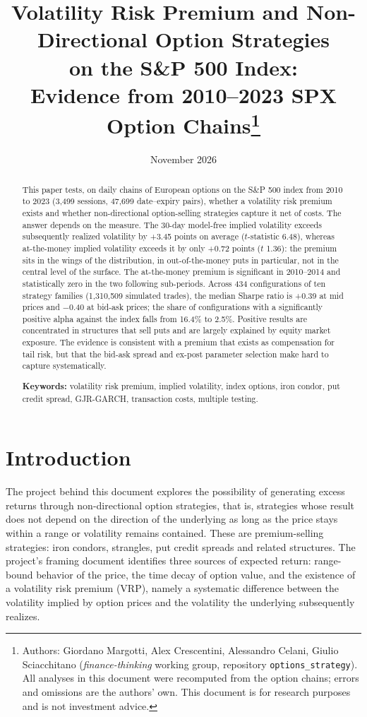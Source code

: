 \documentclass[11pt,a4paper]{article}
\title{Volatility Risk Premium and Non-Directional Option Strategies\\ on the S\&P 500 Index:\\ Evidence from 2010--2023 SPX Option Chains\thanks{Authors: Giordano Margotti, Alex Crescentini, Alessandro Celani, Giulio Sciacchitano (\emph{finance-thinking} working group, repository \texttt{options\_strategy}). All analyses in this document were recomputed from the option chains; errors and omissions are the authors' own. This document is for research purposes and is not investment advice.}}
\author{}
\date{November 2026}
\begin{document}
{\let\newpage\relax\maketitle}
\vspace{-3em}

\begin{abstract}
\noindent This paper tests, on daily chains of European options on the S\&P 500 index from 2010 to 2023 (3,499 sessions, 47,699 date--expiry pairs), whether a volatility risk premium exists and whether non-directional option-selling strategies capture it net of costs. The answer depends on the measure. The 30-day model-free implied volatility exceeds subsequently realized volatility by +3.45 points on average ($t$-statistic 6.48), whereas at-the-money implied volatility exceeds it by only +0.72 points ($t$ 1.36): the premium sits in the wings of the distribution, in out-of-the-money puts in particular, not in the central level of the surface. The at-the-money premium is significant in 2010--2014 and statistically zero in the two following sub-periods. Across 434 configurations of ten strategy families (1,310,509 simulated trades), the median Sharpe ratio is +0.39 at mid prices and $-$0.40 at bid-ask prices; the share of configurations with a significantly positive alpha against the index falls from 16.4\% to 2.5\%. Positive results are concentrated in structures that sell puts and are largely explained by equity market exposure. The evidence is consistent with a premium that exists as compensation for tail risk, but that the bid-ask spread and ex-post parameter selection make hard to capture systematically.

\medskip\noindent\textbf{Keywords:} volatility risk premium, implied volatility, index options, iron condor, put credit spread, GJR-GARCH, transaction costs, multiple testing.
\end{abstract}

\section{Introduction}

The project behind this document explores the possibility of generating excess returns through non-directional option strategies, that is, strategies whose result does not depend on the direction of the underlying as long as the price stays within a range or volatility remains contained. These are premium-selling strategies: iron condors, strangles, put credit spreads and related structures. The project's framing document identifies three sources of expected return: range-bound behavior of the price, the time decay of option value, and the existence of a volatility risk premium (VRP), namely a systematic difference between the volatility implied by option prices and the volatility the underlying subsequently realizes.
\end{document}

